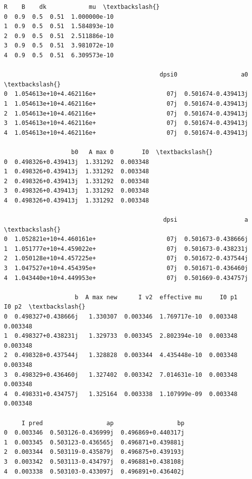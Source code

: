 \documentclass[11pt]{article}
\makeatletter
\newcommand{\boxspacing}{\kern\kvtcb@left@rule\kern\kvtcb@boxsep}
\newcommand{\prompt}[4]{
        {\ttfamily\llap{{\color{#2}[#3]:\hspace{3pt}#4}}\vspace{-\baselineskip}}
    }
\makeatother
\begin{document}
            \begin{tcolorbox}[breakable, size=fbox, boxrule=.5pt, pad at break*=1mm, opacityfill=0]
\prompt{Out}{outcolor}{52}{\boxspacing}
\begin{Verbatim}[commandchars=\\\{\}]
     R    B    dk            mu  \textbackslash{}
0  0.9  0.5  0.51  1.000000e-10
1  0.9  0.5  0.51  1.584893e-10
2  0.9  0.5  0.51  2.511886e-10
3  0.9  0.5  0.51  3.981072e-10
4  0.9  0.5  0.51  6.309573e-10

                                            dpsi0                  a0  \textbackslash{}
0  1.054613e+10+4.462116e+                    07j  0.501674-0.439413j
1  1.054613e+10+4.462116e+                    07j  0.501674-0.439413j
2  1.054613e+10+4.462116e+                    07j  0.501674-0.439413j
3  1.054613e+10+4.462116e+                    07j  0.501674-0.439413j
4  1.054613e+10+4.462116e+                    07j  0.501674-0.439413j

                   b0   A max 0        I0  \textbackslash{}
0  0.498326+0.439413j  1.331292  0.003348
1  0.498326+0.439413j  1.331292  0.003348
2  0.498326+0.439413j  1.331292  0.003348
3  0.498326+0.439413j  1.331292  0.003348
4  0.498326+0.439413j  1.331292  0.003348

                                             dpsi                   a  \textbackslash{}
0  1.052821e+10+4.460161e+                    07j  0.501673-0.438666j
1  1.051777e+10+4.459022e+                    07j  0.501673-0.438231j
2  1.050128e+10+4.457225e+                    07j  0.501672-0.437544j
3  1.047527e+10+4.454395e+                    07j  0.501671-0.436460j
4  1.043440e+10+4.449953e+                    07j  0.501669-0.434757j

                    b  A max new      I v2  effective mu     I0 p1     I0 p2  \textbackslash{}
0  0.498327+0.438666j   1.330307  0.003346  1.769717e-10  0.003348  0.003348
1  0.498327+0.438231j   1.329733  0.003345  2.802394e-10  0.003348  0.003348
2  0.498328+0.437544j   1.328828  0.003344  4.435448e-10  0.003348  0.003348
3  0.498329+0.436460j   1.327402  0.003342  7.014631e-10  0.003348  0.003348
4  0.498331+0.434757j   1.325164  0.003338  1.107999e-09  0.003348  0.003348

     I pred                  ap                  bp
0  0.003346  0.503126-0.436999j  0.496869+0.440317j
1  0.003345  0.503123-0.436565j  0.496871+0.439881j
2  0.003344  0.503119-0.435879j  0.496875+0.439193j
3  0.003342  0.503113-0.434797j  0.496881+0.438108j
4  0.003338  0.503103-0.433097j  0.496891+0.436402j
\end{Verbatim}
\end{tcolorbox}
        
\end{document}
